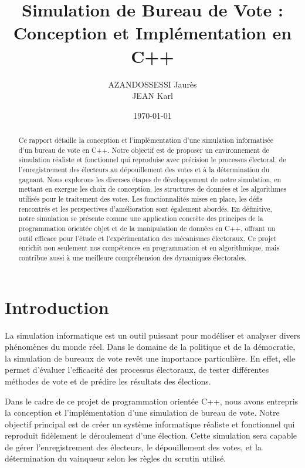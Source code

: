\documentclass[12pt]{article} %
\title{Simulation de Bureau de Vote :\\ Conception et Implémentation en C++}
\author{AZANDOSSESSI Jaurès \\ JEAN Karl}
\date{\today}
\begin{document}
	
	\maketitle
	
	\begin{abstract}
		Ce rapport détaille la conception et l'implémentation d'une simulation informatisée d'un bureau de vote en C++. Notre objectif est de proposer un environnement de simulation réaliste et fonctionnel qui reproduise avec précision le processus électoral, de l'enregistrement des électeurs au dépouillement des votes et à la détermination du gagnant. Nous explorons les diverses étapes de développement de notre simulation, en mettant en exergue les choix de conception, les structures de données et les algorithmes utilisés pour le traitement des votes. Les fonctionnalités mises en place, les défis rencontrés et les perspectives d'amélioration sont également abordés. En définitive, notre simulation se présente comme une application concrète des principes de la programmation orientée objet et de la manipulation de données en C++, offrant un outil efficace pour l'étude et l'expérimentation des mécanismes électoraux. Ce projet enrichit non seulement nos compétences en programmation et en algorithmique, mais contribue aussi à une meilleure compréhension des dynamiques électorales.
	\end{abstract}
	
	\newpage
	

	
	\newpage
			
	\section*{Introduction}
	La simulation informatique est un outil puissant pour modéliser et analyser divers phénomènes du monde réel. Dans le domaine de la politique et de la démocratie, la simulation de bureaux de vote revêt une importance particulière. En effet, elle permet d'évaluer l'efficacité des processus électoraux, de tester différentes méthodes de vote et de prédire les résultats des élections.
	
	Dans le cadre de ce projet de programmation orientée C++, nous avons entrepris la conception et l'implémentation d'une simulation de bureau de vote. Notre objectif principal est de créer un système informatique réaliste et fonctionnel qui reproduit fidèlement le déroulement d'une élection. Cette simulation sera capable de gérer l'enregistrement des électeurs, le dépouillement des votes, et la détermination du vainqueur selon les règles du scrutin utilisé.
	
\end{document}
